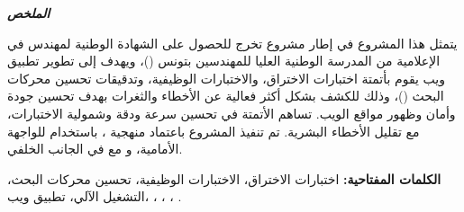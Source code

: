 \vspace{0.3cm}
\begin{center}
    \begin{otherlanguage}{arabic}
        \textbf{\textit{\Huge الملخص}}\\
        \vspace{0.3cm}
    \end{otherlanguage}
\end{center}
\begin{tcolorbox}[colback=white!5!white,colframe=black!75!black]
\begin{otherlanguage}{arabic}
\begin{justify}
يتمثل هذا المشروع في إطار مشروع تخرج للحصول على الشهادة الوطنية لمهندس في الإعلامية من المدرسة الوطنية العليا للمهندسين بتونس (\foreignlanguage{french}{})، ويهدف إلى تطوير تطبيق ويب يقوم بأتمتة اختبارات الاختراق، والاختبارات الوظيفية، وتدقيقات تحسين محركات البحث (\foreignlanguage{french}{})، وذلك للكشف بشكل أكثر فعالية عن الأخطاء والثغرات بهدف تحسين جودة وأمان وظهور مواقع الويب. تساهم الأتمتة في تحسين سرعة ودقة وشمولية الاختبارات، مع تقليل الأخطاء البشرية. تم تنفيذ المشروع باعتماد منهجية \foreignlanguage{french}{}، باستخدام \foreignlanguage{french}{} للواجهة الأمامية، و\foreignlanguage{french}{} مع \foreignlanguage{french}{} في الجانب الخلفي.
\end{justify}
\vspace{0.2cm}
\hspace{-0.5cm}\noindent \textbf{الكلمات المفتاحية:} اختبارات الاختراق، الاختبارات الوظيفية، تحسين محركات البحث، التشغيل الآلي، تطبيق ويب، \foreignlanguage{french}{}، \foreignlanguage{french}{}، \foreignlanguage{french}{}، \foreignlanguage{french}{}.
\end{otherlanguage}
\end{tcolorbox}
